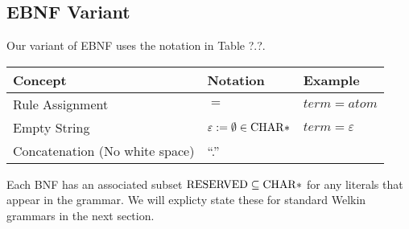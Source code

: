 \subsection{EBNF Variant}
Our variant of EBNF uses the notation in Table ?.?.
\begin{center}
\begin{tabular}{ | m{3cm} | m{5cm} | m{5cm} | }
	\hline
  Concept & Notation & Example \\
  \hline
	Rule Assignment & $=$ & $term = atom$\\
  Empty String & $\varepsilon := \emptyset \in \mathrm{CHAR}*$ & $term = \varepsilon$ \\
  Concatenation (No white space) & ``.'' & \\
  \hline
\end{tabular}
\end{center}
Each BNF has an associated subset $\mathrm{RESERVED} \subseteq \mathrm{CHAR}*$ for any literals that appear in the grammar. We will explicty state these for standard Welkin grammars in the next section.
